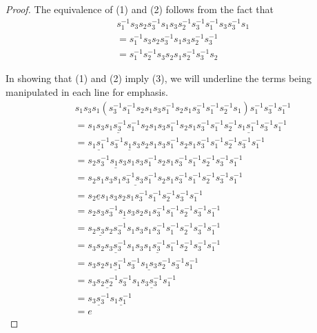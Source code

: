 \documentclass[11pt]{amsart}
\theoremstyle{definition}
\begin{document}
\begin{proof}
The equivalence of (1) and (2) follows from the fact that
\begin{align*}
& s_{1}^{-1}s_{3}s_{2}s_{3}^{-1}s_{1}s_{3}s_{2}^{-1}s_{3}^{-1}s_{1}^{-1}s_{3}s_{3}^{-1}s_{1} \\
&= s_{1}^{-1}s_{3}s_{2}s_{3}^{-1}s_{1}s_{3}s_{2}^{-1}s_{3}^{-1} \\
&= s_{1}^{-1}s_{2}^{-1}s_{3}s_{2}s_{1}s_{2}^{-1}s_{3}^{-1}s_{2}
\end{align*}

In showing that (1) and (2) imply (3), we will underline the terms being manipulated in each line for emphasis.
\begin{align*}
& s_{1}s_{3}s_{1}(s_{3}^{-1}s_{1}^{-1}s_{2}s_{1}s_{3}s_{1}^{-1}s_{2}s_{1}s_{3}^{-1}s_{1}^{-1}s_{2}^{-1}s_{1})s_{1}^{-1}s_{3}^{-1}s_{1}^{-1} \\
&= s_{1}\underline{s_{3}s_{1}s_{3}^{-1}s_{1}^{-1}}s_{2}s_{1}s_{3}s_{1}^{-1}s_{2}s_{1}s_{3}^{-1}s_{1}^{-1}s_{2}^{-1}\underline{s_{1}s_{1}^{-1}}s_{3}^{-1}s_{1}^{-1} \\
&= \underline{s_{1}s_{1}^{-1}}\underline{s_{3}^{-1}s_{1}s_{3}s_{2}}s_{1}s_{3}s_{1}^{-1}s_{2}s_{1}s_{3}^{-1}s_{1}^{-1}s_{2}^{-1}s_{3}^{-1}s_{1}^{-1} \\
&= s_{2}\underline{s_{3}^{-1}s_{1}s_{3}s_{1}}s_{3}s_{1}^{-1}s_{2}s_{1}s_{3}^{-1}s_{1}^{-1}s_{2}^{-1}s_{3}^{-1}s_{1}^{-1} \\
&= s_{2}s_{1}s_{3}\underline{s_{1}s_{3}^{-1}s_{3}s_{1}^{-1}}s_{2}s_{1}s_{3}^{-1}s_{1}^{-1}s_{2}^{-1}s_{3}^{-1}s_{1}^{-1} \\
&= s_{2}\underline{e}s_{1}s_{3}s_{2}s_{1}s_{3}^{-1}s_{1}^{-1}s_{2}^{-1}s_{3}^{-1}s_{1}^{-1} \\
&= s_{2}s_{3}\underline{s_{3}^{-1}s_{1}s_{3}s_{2}}s_{1}s_{3}^{-1}s_{1}^{-1}s_{2}^{-1}s_{3}^{-1}s_{1}^{-1} \\
&= \underline{s_{2}s_{3}s_{2}}s_{3}^{-1}s_{1}s_{3}s_{1}s_{3}^{-1}s_{1}^{-1}s_{2}^{-1}s_{3}^{-1}s_{1}^{-1} \\
&= s_{3}s_{2}\underline{s_{3}s_{3}^{-1}}s_{1}\underline{s_{3}s_{1}s_{3}^{-1}s_{1}^{-1}}s_{2}^{-1}s_{3}^{-1}s_{1}^{-1} \\
&= s_{3}s_{2}\underline{s_{1}s_{1}^{-1}}\underline{s_{3}^{-1}s_{1}s_{3}s_{2}^{-1}}s_{3}^{-1}s_{1}^{-1} \\
&= s_{3}\underline{s_{2}s_{2}^{-1}}s_{3}^{-1}s_{1}\underline{s_{3}s_{3}^{-1}}s_{1}^{-1} \\
&= \underline{s_{3}s_{3}^{-1}}\underline{s_{1}s_{1}^{-1}} \\
&= e
\end{align*}
\end{proof}
\end{document}
